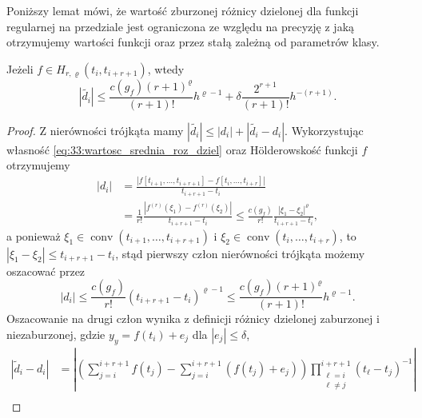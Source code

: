 \documentclass[oik, pdftex, robocza, man]{mgrwms}
\DeclareMathOperator*{\conv}{conv}
\begin{document}
    Poniższy lemat mówi, że wartość zburzonej różnicy dzielonej dla funkcji regularnej na przedziale jest ograniczona ze względu na precyzję z jaką otrzymujemy wartości funkcji oraz przez stałą zależną od parametrów klasy.

    \begin{lemma} \label{lem:algMP_1}
        Jeżeli $f \in H_{r, \varrho}(t_{i}, t_{i+r+1})$, wtedy
        \begin{equation*}
            |\tilde{d_{i}}| \leq \frac{c(g_{f})(r+1)^{\varrho}}{(r+1)!} h^{\varrho-1} + \delta \frac{2^{r+1}}{(r+1)!} h^{-(r+1)}.
        \end{equation*}
    \end{lemma}
    \begin{proof}
        Z nierówności trójkąta mamy $|\tilde{d_{i}}|  \leq |d_{i}| + |\tilde{d_{i}} - d_{i}|$.
        Wykorzystując własność \eqref{eq:33:wartosc_srednia_roz_dziel} oraz Hölderowskość funkcji $f$ otrzymujemy
        \begin{equation}
            \begin{aligned}
            \left|d_{i}\right| &=\frac{\left|f\left[t_{i+1}, \ldots, t_{i+r+1}\right]-f\left[t_{i}, \ldots, t_{i+r}\right]\right|}{t_{i+r+1}-t_{i}} \\
                & = \frac{1}{r !} \frac{\left|f^{(r)}\left(\xi_{1}\right)-f^{(r)}\left(\xi_{2}\right)\right|}{t_{i+r+1}-t_{i}}
                \leq \frac{c\left(g_{f}\right)}{r !} \frac{\left|\xi_{1}-\xi_{2}\right|^{\varrho}}{t_{i+r+1}-t_{i}},
            \end{aligned}
        \end{equation}
        a ponieważ $\xi_{1} \in \conv(t_{i+1}, \ldots, t_{i+r+1})$ i $\xi_{2} \in \conv(t_{i}, \ldots, t_{i+r})$, to $|\xi_{1}- \xi_{2}| \leq t_{i+r+1} - t_{i}$, stąd pierwszy człon nierówności trójkąta możemy oszacować przez
        \begin{equation*}
            \left|d_{i}\right| \leq \frac{c\left(g_{f}\right)}{r !}\left(t_{i+r+1}-t_{i}\right)^{\varrho-1} \leq \frac{c\left(g_{f}\right)(r+1)^{\varrho}}{(r+1) !} h^{\varrho-1}.
        \end{equation*}
        Oszacowanie na drugi człon wynika z definicji różnicy dzielonej zaburzonej i niezaburzonej, gdzie $y_{y} = f(t_{i}) + e_{j}$ dla $|e_{j}| \leq \delta$,
        \begin{equation}
            \begin{aligned}
            \left|\tilde{d}_{i}-d_{i}\right| & = \left| \left( \sum_{j = i}^{i+r+1} f(t_{j}) - \sum_{j = i}^{i+r+1} \left(f(t_{j}) + e_{j}\right) \right) \prod_{\substack{\ell = i \\ \ell \neq j}}^{i+r+1} (t_{\ell} - t_{j})^{-1} \right| \\

\end{aligned}
\end{equation}
\end{proof}
\end{document}
